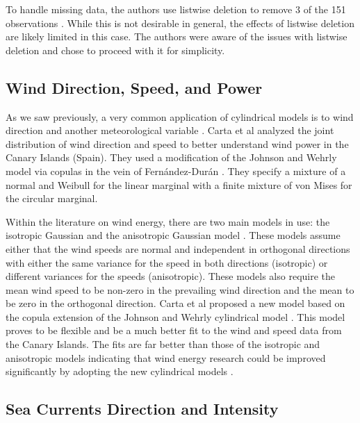 To handle missing data, the authors use listwise deletion to remove 3 of the 151 observations \cite{cremers_regression_2020}. While this is not desirable in general, the effects of listwise deletion are likely limited in this case. The authors were aware of the issues with listwise deletion and chose to proceed with it for simplicity.

\subsection{Wind Direction, Speed, and Power}

As we saw previously, a very common application of cylindrical models is to wind direction and another meteorological variable \cite{carnicero_non-parametric_2013}\cite{garcia-portugues_exploring_2013}. Carta et al analyzed the joint distribution of wind direction and speed to better understand wind power in the Canary Islands (Spain)\cite{carta_joint_2008}. They used a modification of the Johnson and Wehrly model via copulas in the vein of Fern\'{a}ndez-Dur\'{a}n \cite{fernandez-duran_models_2007}. They specify a mixture of a normal and Weibull for the linear marginal with a finite mixture of von Mises for the circular marginal. 

Within the literature on wind energy, there are two main models in use: the isotropic Gaussian and the anisotropic Gaussian model \cite{carta_joint_2008}. These models assume either that the wind speeds are normal and independent in orthogonal directions with either the same variance for the speed in both directions (isotropic) or different variances for the speeds (anisotropic). These models also require the mean wind speed to be non-zero in the prevailing wind direction and the mean to be zero in the orthogonal direction. Carta et al proposed a new model based on the copula extension of the Johnson and Wehrly cylindrical model \cite{carta_joint_2008}\cite{johnson_angular-linear_1978}. This model proves to be flexible and be a much better fit to the wind and speed data from the Canary Islands. The fits are far better than those of the isotropic and anisotropic models indicating that wind energy research could be improved significantly by adopting the new cylindrical models \cite{carta_joint_2008}.


\subsection{Sea Currents Direction and Intensity}

